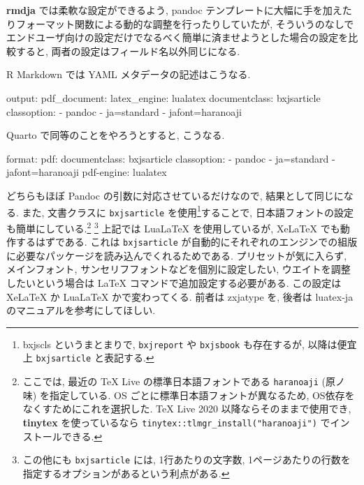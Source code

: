 \documentclass[
  letterpaper,
  DIV=11,
  pandoc,
  ja=standard,
  jafont=noto-otf]{bxjsarticle}
\newenvironment{Shaded}{\begin{snugshade}}{\end{snugshade}}
\newcommand{\AttributeTok}[1]{\textcolor[rgb]{0.00,0.48,0.65}{#1}}
\newcommand{\FunctionTok}[1]{\textcolor[rgb]{0.28,0.35,0.67}{#1}}
\newcommand{\KeywordTok}[1]{\textcolor[rgb]{0.00,0.48,0.65}{#1}}
\begin{document}
\textbf{rmdja} では柔軟な設定ができるよう, pandoc
テンプレートに大幅に手を加えたりフォーマット関数による動的な調整を行ったりしていたが,
そういうのなしでエンドユーザ向けの設定だけでなるべく簡単に済ませようとした場合の設定を比較すると,
両者の設定はフィールド名以外同じになる.

R Markdown では YAML メタデータの記述はこうなる.

\begin{Shaded}
\begin{Highlighting}[]
\FunctionTok{output}\KeywordTok{:}\AttributeTok{ }
\AttributeTok{  }\FunctionTok{pdf\_document}\KeywordTok{:}
\AttributeTok{    }\FunctionTok{latex\_engine}\KeywordTok{:}\AttributeTok{ lualatex}
\FunctionTok{documentclass}\KeywordTok{:}\AttributeTok{ bxjsarticle}
\FunctionTok{classoption}\KeywordTok{:}
\AttributeTok{  }\KeywordTok{{-}}\AttributeTok{ pandoc}
\AttributeTok{  }\KeywordTok{{-}}\AttributeTok{ ja=standard}
\AttributeTok{  }\KeywordTok{{-}}\AttributeTok{ jafont=haranoaji}
\end{Highlighting}
\end{Shaded}

Quarto で同等のことをやろうとすると, こうなる.

\begin{Shaded}
\begin{Highlighting}[]
\FunctionTok{format}\KeywordTok{:}\AttributeTok{ }
\AttributeTok{  }\FunctionTok{pdf}\KeywordTok{:}
\AttributeTok{    }\FunctionTok{documentclass}\KeywordTok{:}\AttributeTok{ bxjsarticle}
\AttributeTok{    }\FunctionTok{classoption}\KeywordTok{:}
\AttributeTok{      }\KeywordTok{{-}}\AttributeTok{ pandoc}
\AttributeTok{      }\KeywordTok{{-}}\AttributeTok{ ja=standard}
\AttributeTok{      }\KeywordTok{{-}}\AttributeTok{ jafont=haranoaji}
\FunctionTok{pdf{-}engine}\KeywordTok{:}\AttributeTok{ lualatex}
\end{Highlighting}
\end{Shaded}

どちらもほぼ Pandoc の引数に対応させているだけなので,
結果として同じになる. また, 文書クラスに \texttt{bxjsarticle}
を使用\footnote{bxjscls というまとまりで, \texttt{bxjreport} や
  \texttt{bxjsbook} も存在するが, 以降は便宜上 \texttt{bxjsarticle}
  と表記する.}することで,
日本語フォントの設定も簡単にしている.\footnote{ここでは, 最近の TeX Live
  の標準日本語フォントである \texttt{haranoaji} (原ノ味) を指定している.
  OS ごとに標準日本語フォントが異なるため,
  OS依存をなくすためにこれを選択した. TeX Live 2020
  以降ならそのままで使用でき, \textbf{tinytex} を使っているなら
  \texttt{tinytex::tlmgr\_install("haranoaji")} でインストールできる.}
\footnote{この他にも \texttt{bxjsarticle} には, 1行あたりの文字数,
  1ページあたりの行数を指定するオプションがあるという利点がある.}
上記では LuaLaTeX を使用しているが, XeLaTeX でも動作するはずである.
これは \texttt{bxjsarticle}
が自動的にそれぞれのエンジンでの組版に必要なパッケージを読み込んでくれるためである.
プリセットが気に入らず, メインフォント,
サンセリフフォントなどを個別に設定したい,
ウエイトを調整したいという場合は LaTeX コマンドで追加設定する必要がある.
この設定は XeLaTeX か LuaLaTeX かで変わってくる. 前者は zxjatype を,
後者は luatex-ja のマニュアルを参考にしてほしい.
\end{document}
